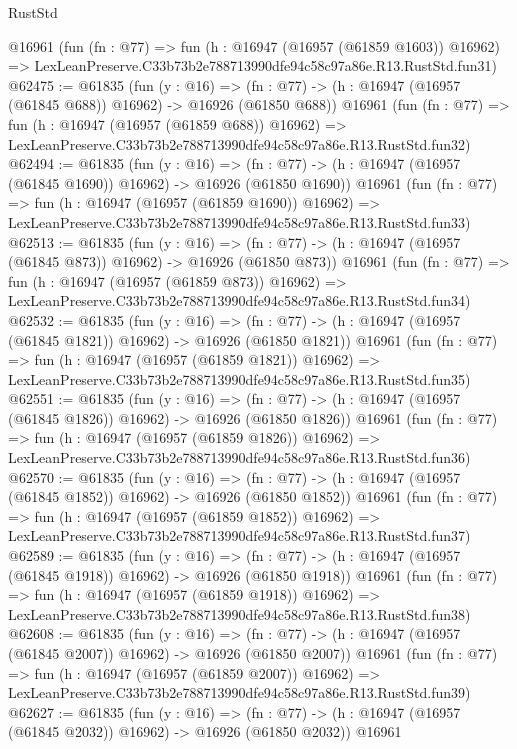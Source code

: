 \begin{lexlean}{RustStd}
\begin{coremodule}
    @16961
    (fun (fn : @77) =>
    fun (h : @16947 (@16957 (@61859 @1603)) @16962) =>
    LexLeanPreserve.C33b73b2e788713990dfe94c58c97a86e.R13.RustStd.fun31)
@62475 := @61835
    (fun (y : @16) =>
    (fn : @77) -> (h : @16947 (@16957 (@61845 @688)) @16962) -> @16926 (@61850 @688))
    @16961
    (fun (fn : @77) =>
    fun (h : @16947 (@16957 (@61859 @688)) @16962) =>
    LexLeanPreserve.C33b73b2e788713990dfe94c58c97a86e.R13.RustStd.fun32)
@62494 := @61835
    (fun (y : @16) =>
    (fn : @77) -> (h : @16947 (@16957 (@61845 @1690)) @16962) -> @16926 (@61850 @1690))
    @16961
    (fun (fn : @77) =>
    fun (h : @16947 (@16957 (@61859 @1690)) @16962) =>
    LexLeanPreserve.C33b73b2e788713990dfe94c58c97a86e.R13.RustStd.fun33)
@62513 := @61835
    (fun (y : @16) =>
    (fn : @77) -> (h : @16947 (@16957 (@61845 @873)) @16962) -> @16926 (@61850 @873))
    @16961
    (fun (fn : @77) =>
    fun (h : @16947 (@16957 (@61859 @873)) @16962) =>
    LexLeanPreserve.C33b73b2e788713990dfe94c58c97a86e.R13.RustStd.fun34)
@62532 := @61835
    (fun (y : @16) =>
    (fn : @77) -> (h : @16947 (@16957 (@61845 @1821)) @16962) -> @16926 (@61850 @1821))
    @16961
    (fun (fn : @77) =>
    fun (h : @16947 (@16957 (@61859 @1821)) @16962) =>
    LexLeanPreserve.C33b73b2e788713990dfe94c58c97a86e.R13.RustStd.fun35)
@62551 := @61835
    (fun (y : @16) =>
    (fn : @77) -> (h : @16947 (@16957 (@61845 @1826)) @16962) -> @16926 (@61850 @1826))
    @16961
    (fun (fn : @77) =>
    fun (h : @16947 (@16957 (@61859 @1826)) @16962) =>
    LexLeanPreserve.C33b73b2e788713990dfe94c58c97a86e.R13.RustStd.fun36)
@62570 := @61835
    (fun (y : @16) =>
    (fn : @77) -> (h : @16947 (@16957 (@61845 @1852)) @16962) -> @16926 (@61850 @1852))
    @16961
    (fun (fn : @77) =>
    fun (h : @16947 (@16957 (@61859 @1852)) @16962) =>
    LexLeanPreserve.C33b73b2e788713990dfe94c58c97a86e.R13.RustStd.fun37)
@62589 := @61835
    (fun (y : @16) =>
    (fn : @77) -> (h : @16947 (@16957 (@61845 @1918)) @16962) -> @16926 (@61850 @1918))
    @16961
    (fun (fn : @77) =>
    fun (h : @16947 (@16957 (@61859 @1918)) @16962) =>
    LexLeanPreserve.C33b73b2e788713990dfe94c58c97a86e.R13.RustStd.fun38)
@62608 := @61835
    (fun (y : @16) =>
    (fn : @77) -> (h : @16947 (@16957 (@61845 @2007)) @16962) -> @16926 (@61850 @2007))
    @16961
    (fun (fn : @77) =>
    fun (h : @16947 (@16957 (@61859 @2007)) @16962) =>
    LexLeanPreserve.C33b73b2e788713990dfe94c58c97a86e.R13.RustStd.fun39)
@62627 := @61835
    (fun (y : @16) =>
    (fn : @77) -> (h : @16947 (@16957 (@61845 @2032)) @16962) -> @16926 (@61850 @2032))
    @16961

\end{coremodule}
\end{lexlean}

